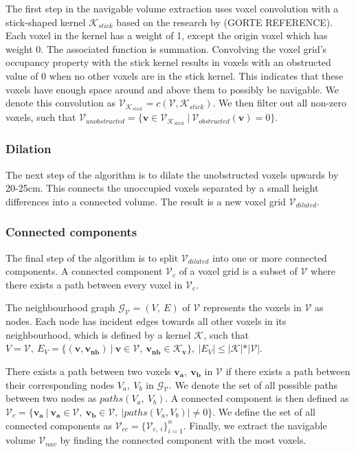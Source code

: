 \documentclass{article}
\begin{document}
The first step in the navigable volume extraction uses voxel convolution with a stick-shaped kernel \(\mathcal{K}_{stick}\) based on the research by (GORTE REFERENCE). Each voxel in the kernel has a weight of 1, except the origin voxel which has weight 0. The associated function is summation. Convolving the voxel grid's occupancy property with the stick kernel results in voxels with an obstructed value of 0 when no other voxels are in the stick kernel. This indicates that these voxels have enough space around and above them to possibly be navigable. We denote this convolution as \(\mathcal{V}_{\mathcal{K}_{stick}} = c(\mathcal{V},\mathcal{K}_{stick})\). We then filter out all non-zero voxels, such that \(\mathcal{V}_{unobstructed}=\{\boldsymbol{v} \in \mathcal{V}_{\mathcal{K}_{stick}}\ |\ \mathcal{V}_{obstructed}(\boldsymbol{v}) = 0\}\). 

\subsubsection{Dilation}
The next step of the algorithm is to dilate the unobstructed voxels upwards by 20-25cm. This connects the unoccupied voxels separated by a small height differences into a connected volume. The result is a new voxel grid \(\mathcal{V}_{dilated}\). 

\subsubsection{Connected components}
The final step of the algorithm is to split \(\mathcal{V}_{dilated}\) into one or more connected components. A connected component \(\mathcal{V}_c\) of a voxel grid is a subset of \(\mathcal{V}\) where there exists a path between every voxel in \(\mathcal{V}_c\). 

The neighbourhood graph \(\mathcal{G}_{\mathcal{V}} = (V,\ E)\) of \(\mathcal{V}\) represents the voxels in \(\mathcal{V}\) as nodes. Each node has incident edges towards all other voxels in its neighbourhood, which is defined by a kernel \(\mathcal{K}\), such that \(V = \mathcal{V},\ E_{V} = \{(\boldsymbol{v}, \boldsymbol{v_{nb}})\ |\ \boldsymbol{v} \in \mathcal{V},\ \boldsymbol{v_{nb}} \in \mathcal{K}_{\boldsymbol{v}}\},\ |E_{V}| \leq |\mathcal{K}|*|\mathcal{V}|\). 

There exists a path between two voxels \(\boldsymbol{v_a},\ \boldsymbol{v_b}\) in \(\mathcal{V}\) if there exists a path between their corresponding nodes \(V_a,\ V_b\) in \(\mathcal{G}_{\mathcal{V}}\). We denote the set of all possible paths between two nodes as \(paths(V_a,\ V_b)\). A connected component is then defined as \(\mathcal{V}_c=\{\boldsymbol{v_a}\ |\ \boldsymbol{v_a} \in \mathcal{V},\ \boldsymbol{v_b} \in \mathcal{V},\ |paths(V_a, V_b)| \neq 0\}\). We define the set of all connected components as \(\mathcal{V}_{cc}=\{\mathcal{V}_{c,\ i}\}_{i=1}^n\). Finally, we extract the navigable volume \(\mathcal{V}_{nav}\) by finding the connected component with the most voxels. 
\end{document}
